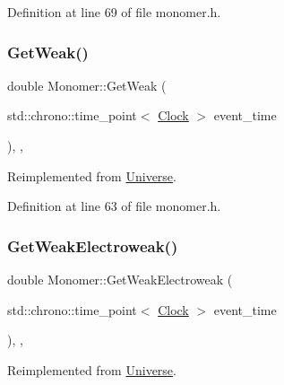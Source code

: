 Definition at line 69 of file monomer.\+h.

\mbox{\label{class_monomer_ac2070d7e39cd0b2a00aa6023ffd51f55}} 
\subsubsection{\texorpdfstring{Get\+Weak()}{GetWeak()}}
{\footnotesize\ttfamily double Monomer\+::\+Get\+Weak (\begin{DoxyParamCaption}\item[{std\+::chrono\+::time\+\_\+point$<$ \mbox{\hyperlink{universe_8h_a0ef8d951d1ca5ab3cfaf7ab4c7a6fd80}{Clock}} $>$}]{event\+\_\+time }\end{DoxyParamCaption})\hspace{0.3cm}{\ttfamily [inline]}, {\ttfamily [final]}, {\ttfamily [virtual]}}



Reimplemented from \mbox{\hyperlink{class_universe_a4476b7e0a3fc1764909f556257fd9ec7}{Universe}}.



Definition at line 63 of file monomer.\+h.

\mbox{\label{class_monomer_aec6e42dde40c5b3142fab880eabb346a}} 
\subsubsection{\texorpdfstring{Get\+Weak\+Electroweak()}{GetWeakElectroweak()}}
{\footnotesize\ttfamily double Monomer\+::\+Get\+Weak\+Electroweak (\begin{DoxyParamCaption}\item[{std\+::chrono\+::time\+\_\+point$<$ \mbox{\hyperlink{universe_8h_a0ef8d951d1ca5ab3cfaf7ab4c7a6fd80}{Clock}} $>$}]{event\+\_\+time }\end{DoxyParamCaption})\hspace{0.3cm}{\ttfamily [inline]}, {\ttfamily [final]}, {\ttfamily [virtual]}}



Reimplemented from \mbox{\hyperlink{class_universe_a645299738e6b798a037f2a15a2e7cf4d}{Universe}}.



